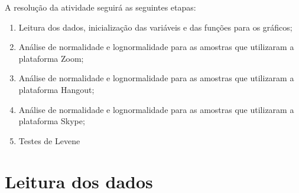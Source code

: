 \documentclass[
]{article}
\begin{document}
A resolução da atividade seguirá as seguintes etapas:

\begin{enumerate}
\def\labelenumi{\arabic{enumi}.}
\item
  Leitura dos dados, inicialização das variáveis e das funções para os
  gráficos;
\item
  Análise de normalidade e lognormalidade para as amostras que
  utilizaram a plataforma Zoom;
\item
  Análise de normalidade e lognormalidade para as amostras que
  utilizaram a plataforma Hangout;
\item
  Análise de normalidade e lognormalidade para as amostras que
  utilizaram a plataforma Skype;
\item
  Testes de Levene
\end{enumerate}

\hypertarget{leitura-dos-dados}{%
\section{Leitura dos dados}\label{leitura-dos-dados}}
\end{document}
